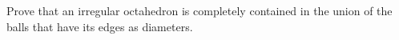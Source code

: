 Prove that an irregular octahedron is completely contained
in the union of the balls that have its edges as diameters.
